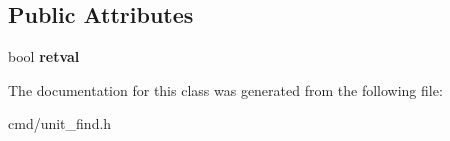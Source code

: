 \subsection*{Public Attributes}
\begin{DoxyCompactItemize}
\item 
bool {\bfseries retval}\hypertarget{classUnitPtrLocator_a098ffefd09aa52579a130af4915dd1d5}{}\label{classUnitPtrLocator_a098ffefd09aa52579a130af4915dd1d5}

\end{DoxyCompactItemize}


The documentation for this class was generated from the following file\+:\begin{DoxyCompactItemize}
\item 
cmd/unit\+\_\+find.\+h\end{DoxyCompactItemize}
